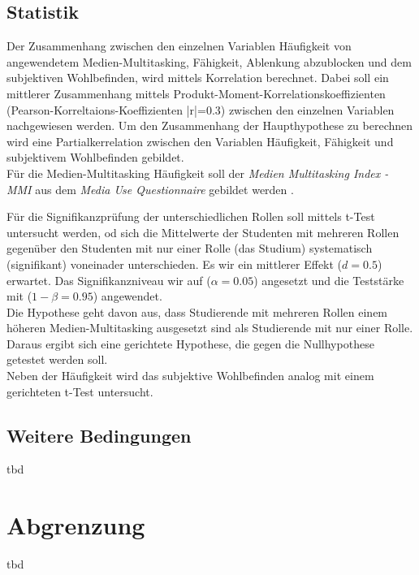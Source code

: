 \subsection*{Statistik}
Der Zusammenhang zwischen den einzelnen Variablen Häufigkeit von angewendetem Medien-Multitasking, Fähigkeit, Ablenkung abzublocken und dem subjektiven Wohlbefinden, wird mittels Korrelation berechnet. Dabei soll ein mittlerer Zusammenhang mittels Produkt-Moment-Korrelationskoeffizienten (Pearson-Korreltaions-Koeffizienten |r|=0.3) zwischen den einzelnen Variablen nachgewiesen werden. Um den Zusammenhang der Haupthypothese zu berechnen wird eine Partialkerrelation zwischen den Variablen Häufigkeit, Fähigkeit und subjektivem Wohlbefinden gebildet.\\
Für die Medien-Multitasking Häufigkeit soll der \textit{Medien Multitasking Index - MMI} aus dem \textit{Media Use Questionnaire} gebildet werden \cite{Ophir2009}.\par
Für die Signifikanzprüfung der unterschiedlichen Rollen soll mittels t-Test untersucht werden, od sich die Mittelwerte der Studenten mit mehreren Rollen gegenüber den Studenten mit nur einer Rolle (das Studium) systematisch (signifikant) voneinader unterschieden. Es wir ein mittlerer Effekt ($d=0.5$) erwartet. Das Signifikanzniveau wir auf ($\alpha=0.05$) angesetzt und die Teststärke mit ($1-\beta=0.95$) angewendet.\\
Die Hypothese geht davon aus, dass Studierende mit mehreren Rollen einem höheren Medien-Multitasking ausgesetzt sind als Studierende mit nur einer Rolle. Daraus ergibt sich eine gerichtete Hypothese, die gegen die Nullhypothese getestet werden soll.\\
Neben der Häufigkeit wird das subjektive Wohlbefinden analog mit einem gerichteten t-Test untersucht.
\subsection*{Weitere Bedingungen}
tbd
\section*{Abgrenzung}\label{section.abgrenzung}
tbd
